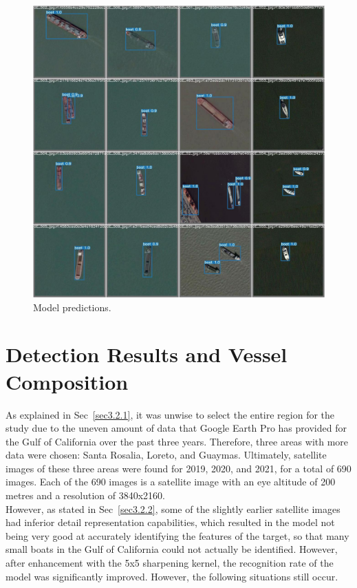 \begin{figure}[h!]
    \centering
    \includegraphics[scale=0.33]{img/test_batch1_pred.jpg}
    \caption{Model predictions.}
    \label{fig:test_batch1_pred}
\end{figure}


\newpage
\section{Detection Results and Vessel Composition}
As explained in Sec~\ref{sec3.2.1}, it was unwise to select the entire region for the study due to the uneven amount of data that Google Earth Pro has provided for the Gulf of California over the past three years. Therefore, three areas with more data were chosen: Santa Rosalia, Loreto, and Guaymas. Ultimately, satellite images of these three areas were found for 2019, 2020, and 2021, for a total of 690 images. Each of the 690 images is a satellite image with an eye altitude of 200 metres and a resolution of 3840x2160.\\

However, as stated in Sec~\ref{sec3.2.2}, some of the slightly earlier satellite images had inferior detail representation capabilities, which resulted in the model not being very good at accurately identifying the features of the target, so that many small boats in the Gulf of California could not actually be identified. However, after enhancement with the 5x5 sharpening kernel, the recognition rate of the model was significantly improved. However, the following situations still occur.\\

